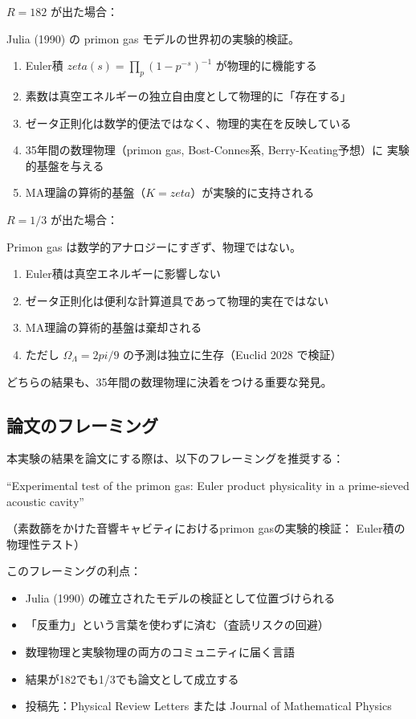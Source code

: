 \documentclass[11pt,a4paper]{article}
\def\pi{pi}%
\def\zeta{zeta}%
\def\textbf#1{#1}%
\begin{document}
\begin{tcolorbox}[colback=green!5,colframe=green!60!black]
\textbf{$R = 182$ が出た場合}：

Julia (1990) の primon gas モデルの\textbf{世界初の実験的検証}。

\begin{enumerate}
\item Euler積 $\zeta(s) = \prod_p (1 - p^{-s})^{-1}$ が物理的に機能する
\item 素数は真空エネルギーの独立自由度として物理的に「存在する」
\item ゼータ正則化は数学的便法ではなく、物理的実在を反映している
\item 35年間の数理物理（primon gas, Bost-Connes系, Berry-Keating予想）に
  実験的基盤を与える
\item MA理論の算術的基盤（$K = \zeta$）が実験的に支持される
\end{enumerate}

\textbf{$R = 1/3$ が出た場合}：

Primon gas は数学的アナロジーにすぎず、物理ではない。

\begin{enumerate}
\item Euler積は真空エネルギーに影響しない
\item ゼータ正則化は便利な計算道具であって物理的実在ではない
\item MA理論の算術的基盤は棄却される
\item ただし $\Omega_\Lambda = 2\pi/9$ の予測は独立に生存（Euclid 2028 で検証）
\end{enumerate}

\textbf{どちらの結果も、35年間の数理物理に決着をつける重要な発見。}
\end{tcolorbox}

\subsection{論文のフレーミング}

本実験の結果を論文にする際は、以下のフレーミングを推奨する：

\begin{tcolorbox}[colback=blue!5,colframe=blue!50!black,title=推奨する論文タイトル]
\textbf{``Experimental test of the primon gas: Euler product
physicality in a prime-sieved acoustic cavity''}

（素数篩をかけた音響キャビティにおけるprimon gasの実験的検証：
Euler積の物理性テスト）
\end{tcolorbox}

このフレーミングの利点：
\begin{itemize}
\item Julia (1990) の確立されたモデルの検証として位置づけられる
\item 「反重力」という言葉を使わずに済む（査読リスクの回避）
\item 数理物理と実験物理の両方のコミュニティに届く言語
\item 結果が182でも1/3でも論文として成立する
\item 投稿先：Physical Review Letters または Journal of Mathematical Physics
\end{itemize}
\end{document}
